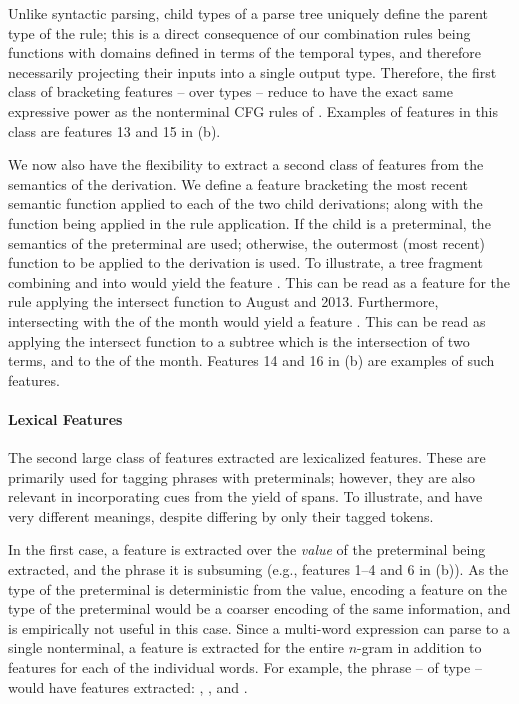 Unlike syntactic parsing, child types of a parse tree
  uniquely define the parent type of the rule; this is a direct consequence
  of our combination rules being functions with domains defined in terms of the
  temporal types, and therefore necessarily projecting
  their inputs into a single output type.
Therefore, the first class of bracketing features -- over
  types -- reduce to have the exact same
  expressive power as the nonterminal CFG rules of \me.
Examples of features in this class are features 13 and 15
  in  (b).

We now also have the flexibility to extract a second class of features
  from the semantics of the derivation.
We define a feature bracketing the most recent semantic function
  applied to each of the two child derivations; along with the function being
  applied in the rule application.
If the child is a preterminal, the semantics of the preterminal are used;
  otherwise, the outermost (most recent) function to be applied to the
  derivation is used.
To illustrate, a tree fragment combining  and  into
   would yield the feature .
This can be read as a feature for the rule applying the intersect function
  to August and 2013.
Furthermore, intersecting  with the  of the month would
  yield a feature .
This can be read as applying the intersect function to a subtree which is
  the intersection of two terms, and to the  of the month.
Features 14 and 16 in  (b) are examples of such features.


\paragraph{Lexical Features}
The second large class of features extracted are lexicalized features.
These are primarily used for tagging phrases with preterminals;
  however, they are also relevant in incorporating cues from the yield
  of  spans.
To illustrate,  and  have very different meanings,
  despite differing by only their  tagged tokens.

In the first case, a feature is extracted over the \textit{value} of the
  preterminal being extracted, and the phrase it is subsuming
  (e.g., features 1--4 and 6 in  (b)).
As the type of the preterminal is deterministic from the value, encoding
  a feature on the type of the preterminal would be a coarser encoding of
  the same information, and is empirically not useful in this case.
Since a multi-word expression can parse to a single nonterminal, a feature
  is extracted for the entire $n$-gram in addition to features for each of the
  individual words.
For example, the phrase  -- of type  -- would have
  features extracted:
  ,
  , and
  .

